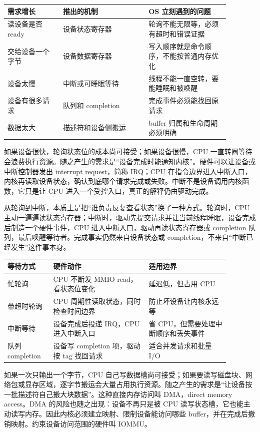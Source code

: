 \begin{longtable}{p{0.22\linewidth}p{0.34\linewidth}p{0.32\linewidth}}
\toprule
需求增长 & 推出的机制 & OS 立刻遇到的问题 \\
\midrule
读设备是否 ready & 设备状态寄存器 & 轮询不能无限等，必须有超时和错误证据 \\
交给设备一个字节 & 设备数据寄存器 & 写入顺序就是命令顺序，不能按普通内存优化 \\
设备太慢 & 中断或可睡眠等待 & 线程不能一直空转，要能睡眠和被唤醒 \\
设备有很多请求 & 队列和 completion & 完成事件必须能找回原请求 \\
数据太大 & 描述符和设备侧搬运 & buffer 归属和生命周期必须明确 \\
\bottomrule
\end{longtable}

如果设备很快，轮询状态位的成本尚可接受；如果设备很慢，CPU 一直转圈等待会浪费执行资源。随之产生的需求是“设备完成时能通知内核”。硬件可以让设备或中断控制器发出 interrupt request，简称 IRQ；CPU 在指令边界进入中断入口，内核再读取设备状态，确认到底哪个请求完成或失败。中断不是设备调用内核函数，它只是让 CPU 进入一个受控入口，真正的解释仍由驱动完成。

从轮询到中断，本质上是把“谁负责反复查看状态”换了一种方式。轮询时，CPU 主动一遍遍读状态寄存器；中断时，驱动先提交请求并让当前线程睡眠，设备完成后制造一个硬件事件，CPU 进入中断入口，驱动再读状态寄存器或 completion 队列，最后唤醒等待者。完成事实仍然来自设备状态或 completion，不来自“中断已经发生”这件事本身。

\begin{longtable}{p{0.18\linewidth}p{0.38\linewidth}p{0.32\linewidth}}
\toprule
等待方式 & 硬件动作 & 适用边界 \\
\midrule
忙轮询 & CPU 不断发 MMIO read，看状态位变化 & 延迟低，但占用 CPU \\
带超时轮询 & CPU 周期性读取状态，同时检查时间边界 & 防止坏设备让内核永远等 \\
中断等待 & 设备完成后投递 IRQ，CPU 进入中断入口 & 省 CPU，但需要处理中断顺序和丢失事件 \\
队列 completion & 设备写 completion 项，驱动按 tag 找回请求 & 适合并发请求和批量 I/O \\
\bottomrule
\end{longtable}

如果一次只输出一个字节，CPU 自己写数据槽尚可接受；如果要读写磁盘块、网络包或显存区域，逐字节搬运会大量占用执行资源。随之产生的需求是“让设备按一批描述符自己搬大块数据”。这种直接内存访问叫 DMA，direct memory access。DMA 的风险也随之出现：设备不再只是被 CPU 读写状态槽，它也能主动读写内存。因此内核必须建立映射、限制设备能访问哪些 buffer，并在完成后撤销映射。约束设备访问范围的硬件叫 IOMMU。

